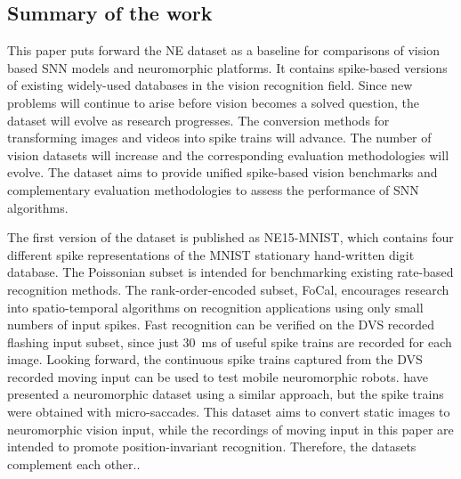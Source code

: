 \documentclass{frontiersENG} %
\begin{document}
\subsection{Summary of the work}
This paper puts forward the NE dataset as a baseline for comparisons of vision based SNN models and neuromorphic platforms.
It contains spike-based versions of existing widely-used databases in the vision recognition field.
Since new problems will continue to arise before vision becomes a solved question, the dataset will evolve as research progresses. 
The conversion methods for transforming images and videos into spike trains will advance. The number of vision datasets will increase and the corresponding evaluation methodologies will evolve.
The dataset aims to provide unified spike-based vision benchmarks and complementary evaluation methodologies to assess the performance of SNN algorithms.

The first version of the dataset is published as NE15-MNIST, which contains four different spike representations of the MNIST stationary hand-written digit database.
The Poissonian subset is intended for benchmarking existing rate-based recognition methods.
The rank-order-encoded subset, FoCal, encourages research into spatio-temporal algorithms on recognition applications using only small numbers of input spikes.
Fast recognition can be verified on the DVS recorded flashing input subset, since just 30~ms of useful spike trains are recorded for each image.
Looking forward, the continuous spike trains captured from the DVS recorded moving input can be used to test mobile neuromorphic robots.
\cite{orchard2015convert} have presented a neuromorphic dataset using a similar approach, but the spike trains were obtained with micro-saccades.
This dataset aims to convert static images to neuromorphic vision input, while the recordings of moving input in this paper are intended to promote position-invariant recognition.
Therefore, the datasets complement each other..
\end{document}
